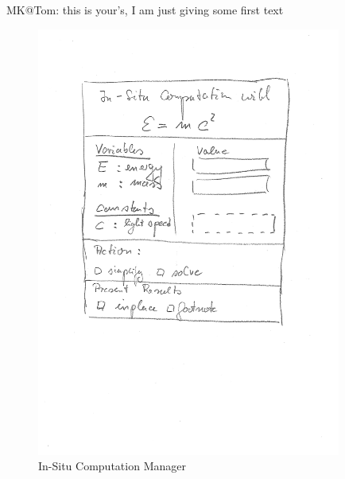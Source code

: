 \begin{newpart}{MK@Tom: this is your's, I am just giving some first text}
  \begin{figure}[ht]\centering
    \includegraphics[width=10cm]{compman}
    \caption{In-Situ Computation Manager}\label{fig:compman}
  \end{figure}
\end{newpart}

